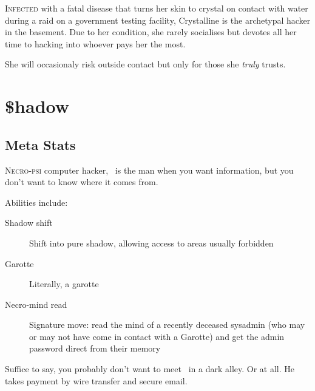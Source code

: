 \documentclass[a4paper,onepage]{memoir}
\begin{document}
\begin{npcdescription}
  \lettrine{I}{nfected} with a fatal disease that turns her skin to crystal on
  contact with water during a raid on a government testing facility, Crystalline
  is the archetypal hacker in the basement. Due to her condition, she rarely
  socialises but devotes all her time to hacking into whoever pays her the most.

  She will occasionaly risk outside contact but only for those she \emph{truly}
  trusts.
\end{npcdescription}



\section{\$hadow}

\begin{character*}[shadow]
     

\end{character*}


\subsection{Meta Stats}

\begin{npcdescription}
  \lettrine{N}{ecro-psi} computer hacker, \shadow\ is the man when you want
  information, but you don't want to know where it comes from.

  Abilities include:
  \begin{description}
  \item[Shadow shift] Shift into pure shadow, allowing access to areas usually
    forbidden
  \item[Garotte] Literally, a garotte
  \item[Necro-mind read] Signature move: read the mind of a recently deceased
    sysadmin (who may or may not have come in contact with a Garotte) and get
    the admin password direct from their memory
  \end{description}

  Suffice to say, you probably don't want to meet \shadow\ in a dark alley. Or
  at all. He takes payment by wire transfer and secure email.
\end{npcdescription}
\end{document}
